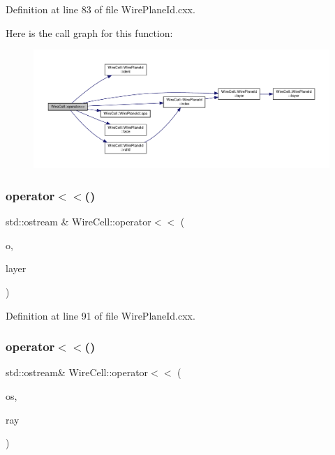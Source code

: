 Definition at line 83 of file Wire\+Plane\+Id.\+cxx.

Here is the call graph for this function\+:
\nopagebreak
\begin{figure}[H]
\begin{center}
\leavevmode
\includegraphics[width=350pt]{namespace_wire_cell_a470282420df828d72316462cefed8139_cgraph}
\end{center}
\end{figure}
\mbox{\label{namespace_wire_cell_a9f35d6b6f8b4ed877efb37690b51803f}} 
\subsubsection{\texorpdfstring{operator$<$$<$()}{operator<<()}\hspace{0.1cm}{\footnotesize\ttfamily [2/6]}}
{\footnotesize\ttfamily std\+::ostream \& Wire\+Cell\+::operator$<$$<$ (\begin{DoxyParamCaption}\item[{std\+::ostream \&}]{o,  }\item[{const \hyperlink{namespace_wire_cell_a761397ff086f0a7e1a1d9ccd251ac618}{Wire\+Cell\+::\+Wire\+Plane\+Layer\+\_\+t} \&}]{layer }\end{DoxyParamCaption})}



Definition at line 91 of file Wire\+Plane\+Id.\+cxx.

\mbox{\label{namespace_wire_cell_aa628a54a76d3cfd3fa4701840de17400}} 
\subsubsection{\texorpdfstring{operator$<$$<$()}{operator<<()}\hspace{0.1cm}{\footnotesize\ttfamily [3/6]}}
{\footnotesize\ttfamily std\+::ostream\& Wire\+Cell\+::operator$<$$<$ (\begin{DoxyParamCaption}\item[{std\+::ostream \&}]{os,  }\item[{const \hyperlink{namespace_wire_cell_a3ab20d9b438feb7eb1ffaab9ba98af0c}{Wire\+Cell\+::\+Ray} \&}]{ray }\end{DoxyParamCaption})\hspace{0.3cm}{\ttfamily [inline]}}



